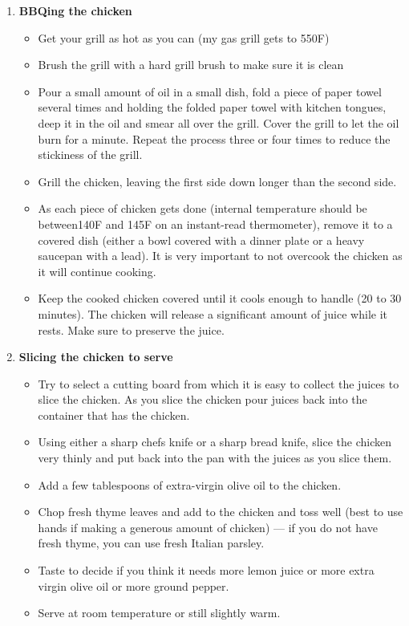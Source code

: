 \documentclass[11pt,letterpaper]{article}
\begin{document}
\begin{description}
\begin{enumerate}
\begin{itemize}
	 	\end{itemize}
	\item {\bf BBQing the chicken}
	\begin{itemize}
	\item Get your grill as hot as you can (my gas grill gets to 550F)
	 \item Brush the grill with a hard grill brush to make sure it is clean
	 \item Pour a small amount of oil in a small dish, fold a piece of paper towel several times and holding the folded paper towel with kitchen tongues, deep it in the oil and smear all over the grill. Cover the grill to let the oil burn for a minute. Repeat the process three or four times to reduce the stickiness of the grill. 
	\item Grill the chicken, leaving the first side down longer than the second side.
	 \item As each piece of chicken gets done (internal temperature should be between140F and 145F on an instant-read thermometer), remove it to a covered dish (either a bowl covered with a dinner plate or a heavy saucepan with a lead). It is very important to not overcook the chicken as it will continue cooking.
	 \item Keep the cooked chicken covered until it cools enough to handle (20 to 30 minutes). The chicken will release a significant amount of juice while it rests. Make sure to preserve the juice.
	\end{itemize}
	\item {\bf Slicing the chicken to serve}
	\begin{itemize}
        		\item Try to select a cutting board from which it is easy to collect the juices to slice the chicken. As you slice the chicken pour juices back into the container that has the chicken.
		\item Using either a sharp chefs knife or a sharp bread knife, slice the chicken very thinly and put back into the pan with the juices as you slice them.
		\item Add a few tablespoons of extra-virgin olive oil to the chicken.
		\item Chop fresh thyme leaves and  add to the chicken and toss well (best to use hands if making a generous amount of chicken) --- if you do not have fresh thyme, you can use fresh Italian parsley.
		\item Taste to decide if you think it needs more lemon juice or more extra virgin olive oil or more ground pepper.
		\item Serve at room temperature or still slightly warm.
	\end{itemize}
     	\end{enumerate}         
\end{description}
\end{document}
